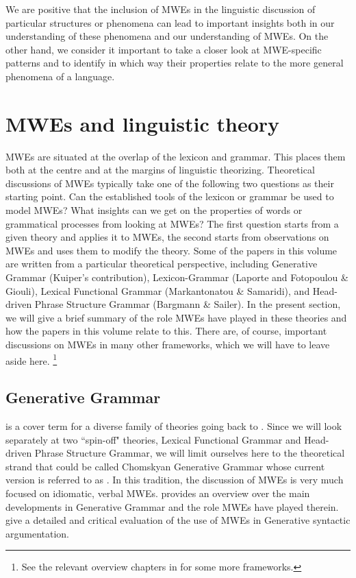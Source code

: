 \documentclass[output=paper]{langsci/langscibook}
\begin{document}
We are positive that the inclusion of MWEs in the linguistic discussion of particular structures or phenomena can lead to important insights both in our understanding of these phenomena and our understanding of MWEs. On the other hand, we consider it important to take a closer look at MWE-specific patterns and to identify in which way their properties relate to the more general phenomena of a language. 




\section{MWEs and linguistic theory}\label{Sec-LinguisticTheory} 

MWEs are situated at the overlap of the lexicon and grammar. This places them both at the centre and at the margins of linguistic theorizing. Theoretical discussions of MWEs typically take one of the following two questions as their starting point. Can the established tools of the lexicon or grammar be used to model MWEs? What insights can we get on the properties of words or grammatical processes from looking at MWEs? The first question starts from a given theory and applies it to MWEs, the second starts from observations on MWEs and uses them to modify the theory.
Some of the papers in this volume are written from a particular theoretical perspective, including Generative Grammar (Kuiper’s contribution), Lexicon-Grammar (Laporte and Fotopoulou \& Giouli), %
Lexical Functional Grammar (Markantonatou \& Samaridi), and Head-driven Phrase Structure Grammar (Bargmann \& Sailer). In the present section, we will give a brief summary of the role MWEs have played in these theories and how the papers in this volume relate to this. There are, of course, important discussions on MWEs in many other frameworks, which we will have to leave aside here.%
\footnote{See the relevant overview chapters in  \cite{Burger:al:07.2} for some more frameworks.}

\subsection{Generative Grammar} \label{Sec-GG}
 is a cover term for a diverse family of theories going back to \cite{Chomsky1957}. Since we will look separately at two ``spin-off" theories, Lexical Functional Grammar and Head-driven Phrase Structure Grammar, we will limit ourselves here to the theoretical strand that could be called Chomskyan Generative Grammar whose current version is referred to as  \citep{Chomsky:95}. In this tradition, the discussion of MWEs is very much focused on idiomatic, verbal MWEs.  \cite{Kuiper:04} provides an overview over the main developments in Generative Grammar and the role MWEs have played therein. \cite{Nunberg1994} give a detailed and critical evaluation of the use of MWEs in Generative syntactic argumentation. 
\end{document}
